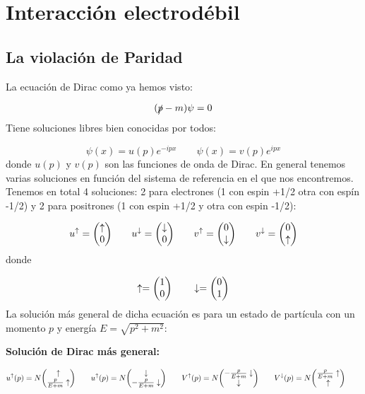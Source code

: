 \chapter{Interacción electrodébil}

\section{La violación de Paridad}

La ecuación de Dirac como ya hemos visto: 

\begin{equation}
    (\slashed{p} - m ) \psi = 0
\end{equation} 
Tiene soluciones libres bien conocidas por todos: 

\begin{equation}
    \psi(x) = u(p) e^{-ipx} \quad  \quad \psi(x) = v(p) e^{ipx}
\end{equation}
donde $u(p)$ y $v(p)$ son las funciones de onda de Dirac. En general tenemos varias soluciones en función del sistema de referencia en el que nos encontremos. Tenemos en total 4 soluciones: 2 para electrones (1 con espin +1/2 otra con espín -1/2) y 2 para positrones (1 con espin +1/2 y otra con espin -1/2): 

\begin{equation*}
    u^\uparrow = \mqty(\uparrow \\ 0)  \qquad 
    u^\downarrow = \mqty(\downarrow \\ 0)  \qquad 
    v^\uparrow = \mqty( 0 \\ \downarrow) \qquad 
    v^\downarrow = \mqty(0 \\ \uparrow)   
\end{equation*}
donde 

\begin{equation*}
    \uparrow = \mqty(1 \\ 0) \qquad 
    \downarrow = \mqty(0 \\ 1)
\end{equation*}
La solución más general de dicha ecuación es para un estado de partícula con un momento $p$ y energía $E=\sqrt{p^2 + m^2}$:

\begin{Resaltar}
    \begin{center}
    \textbf{Solución de Dirac más general:}
    \end{center}
    \begin{equation*}
        u^\uparrow(p) = N  \mqty(\uparrow \\ \frac{p}{E+m} \uparrow)  \qquad 
        u^\uparrow(p) = N  \mqty(\downarrow \\ -\frac{p}{E+m} \downarrow)  \qquad 
        V^\uparrow(p) = N  \mqty(-\frac{p}{E+m}\downarrow \\ \downarrow)  \qquad 
        V^\downarrow(p) = N  \mqty(\frac{p}{E+m}\uparrow \\ \uparrow)  \qquad 
    \end{equation*}
\end{Resaltar}
